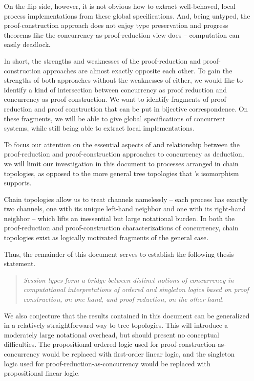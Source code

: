 On the flip side, however, it is not obvious how to extract well-behaved, local process implementations from these global specifications.
And, being untyped, the proof-construction approach does not enjoy type preservation and progress theorems like the concurrency-as-proof-reduction view does -- computation can easily deadlock.

In short, the strengths and weaknesses of the proof-reduction and proof-construction approaches are almost exactly opposite each other.
To gain the strengths of both approaches without the weaknesses of either, we would like to identify a kind of intersection between concurrency as proof reduction and concurrency as proof construction.
We want to identify fragments of proof reduction and proof construction that can be put in bijective correspondence.
On these fragments, we will be able to give global specifications of concurrent systems, while still being able to extract local implementations.

To focus our attention on the essential aspects of and relationship between the proof-reduction and proof-construction approaches to concurrency as deduction, we will limit our investigation in this document to processes arranged in chain topologies, as opposed to the more general tree topologies that \citeauthor{Caires+:MSCS16}'s isomorphism supports.

Chain topologies allow us to treat channels namelessly -- each process has exactly two channels, one with its unique left-hand neighbor and one with its right-hand neighbor -- which lifts an inessential but large notational burden.
In both the proof-reduction and proof-construction characterizations of concurrency, chain topologies exist as logically motivated fragments of the general case.

Thus, the remainder of this document serves to establish the following thesis statement.
\begin{quotation}
  \normalsize
  \itshape Session types form a bridge between distinct notions of concurrency in computational interpretations of ordered and singleton logics based on proof construction, on one hand, and proof reduction, on the other hand.
\end{quotation}

We also conjecture that the results contained in this document can be generalized in a relatively straightforward way to tree topologies.
This will introduce a moderately large notational overhead, but should present no conceptual difficulties.
The propositional ordered logic used for proof-construction-as-concurrency would be replaced with first-order linear logic, and the singleton logic used for proof-reduction-as-concurrency would be replaced with propositional linear logic.

